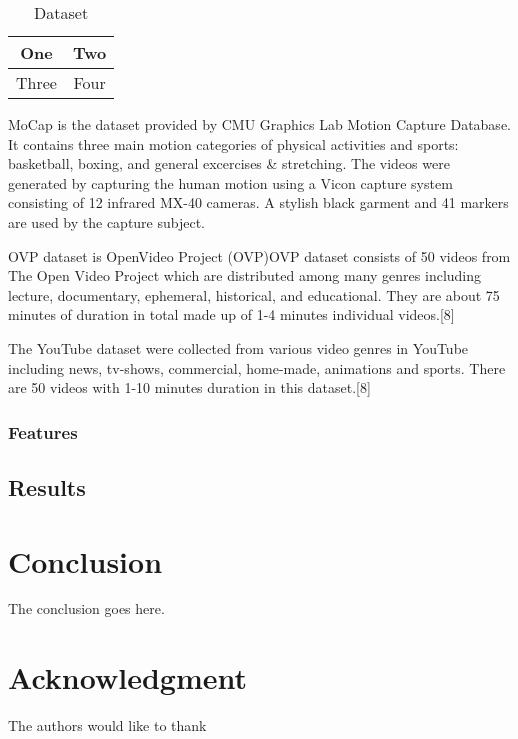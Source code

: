 \documentclass[conference]{IEEEtran}
\begin{document}
\begin{table}[!t]
\caption{Dataset}
\centering
\begin{tabular}{|c||c|}
\hline
One & Two\\
\hline
Three & Four\\
\hline
\end{tabular}
\end{table}


MoCap is the dataset provided by CMU Graphics Lab Motion Capture Database. It contains three main motion categories of physical activities and sports: basketball, boxing, and general excercises \& stretching. The videos were generated by capturing the human motion using a Vicon capture system consisting of 12 infrared MX-40 cameras. A stylish black garment and 41 markers are used by the capture subject.

OVP dataset is OpenVideo Project (OVP)OVP dataset consists of 50 videos from The Open Video Project which are distributed among many genres including lecture, documentary, ephemeral, historical, and educational. They are about 75 minutes of duration in total made up of 1-4 minutes individual videos.[8]

The YouTube dataset were collected from various video genres in YouTube including news, tv-shows, commercial, home-made, animations and sports. There are 50 videos with 1-10 minutes duration in this dataset.[8]

\subsubsection{Features}

\subsection{Results}

\section{Conclusion}
The conclusion goes here.


\newpage

\section*{Acknowledgment}

The authors would like to thank








\end{document}
